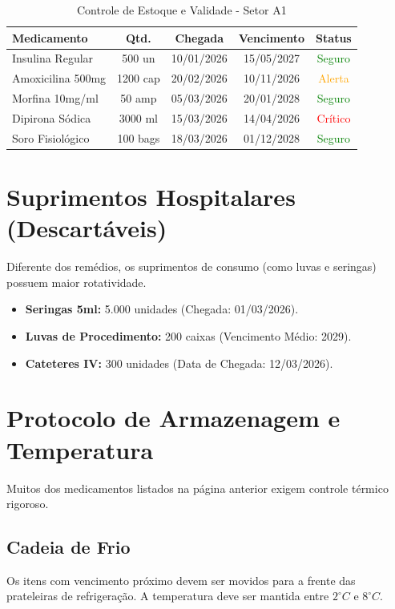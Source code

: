 \documentclass[12pt,a4paper]{article}
\begin{document}
\begin{table}[h]
\centering
\begin{tabularx}{\textwidth}{|X|c|c|c|c|}
\hline
\textbf{Medicamento} & \textbf{Qtd.} & \textbf{Chegada} & \textbf{Vencimento} & \textbf{Status} \\ \hline
Insulina Regular & 500 un & 10/01/2026 & 15/05/2027 & \textcolor{green}{Seguro} \\ \hline
Amoxicilina 500mg & 1200 cap & 20/02/2026 & 10/11/2026 & \textcolor{orange}{Alerta} \\ \hline
Morfina 10mg/ml & 50 amp & 05/03/2026 & 20/01/2028 & \textcolor{green}{Seguro} \\ \hline
Dipirona Sódica & 3000 ml & 15/03/2026 & 14/04/2026 & \textcolor{red}{Crítico} \\ \hline
Soro Fisiológico & 100 bags & 18/03/2026 & 01/12/2028 & \textcolor{green}{Seguro} \\ \hline
\end{tabularx}
\caption{Controle de Estoque e Validade - Setor A1}
\end{table}

\section{Suprimentos Hospitalares (Descartáveis)}
Diferente dos remédios, os suprimentos de consumo (como luvas e seringas) possuem maior rotatividade.

\begin{itemize}
    \item \textbf{Seringas 5ml:} 5.000 unidades (Chegada: 01/03/2026).
    \item \textbf{Luvas de Procedimento:} 200 caixas (Vencimento Médio: 2029).
    \item \textbf{Cateteres IV:} 300 unidades (Data de Chegada: 12/03/2026).
\end{itemize}

\newpage

\section{Protocolo de Armazenagem e Temperatura}
Muitos dos medicamentos listados na página anterior exigem controle térmico rigoroso.

\subsection{Cadeia de Frio}
Os itens com vencimento próximo devem ser movidos para a frente das prateleiras de refrigeração. A temperatura deve ser mantida entre $2^\circ C$ e $8^\circ C$.
\end{document}
